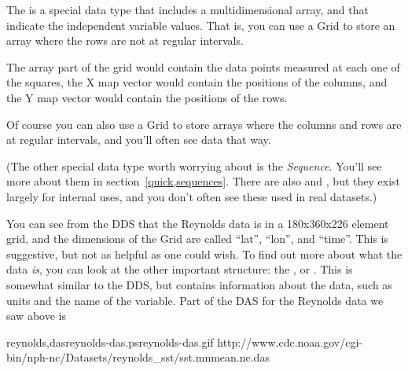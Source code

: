 \documentclass{dods-book}
\begin{document}
The  is a special \opendap data type that includes a
multidimensional array, and  that indicate the
independent variable values.  That is, you can use a Grid to store an
array where the rows are not at regular intervals.  


The array part of the grid would contain the data points measured at
each one of the squares, the X map vector would contain the positions
of the columns, and the Y map vector would contain the positions of
the rows.

Of course you can also use a Grid to store arrays where the columns
and rows are at regular intervals, and you'll often see \opendap data that
way. 

(The other special \opendap data type worth worrying about is the
\emph{Sequence}.  You'll see more about them in
section~\ref{quick,sequences}.  There are also  and
, but they exist largely for internal uses, and you don't
often see these used in real datasets.)

You can see from the DDS that the Reynolds data is in a 180x360x226
element grid, and the dimensions of the Grid are called ``lat'',
``lon'', and ``time''.  This is suggestive, but not as helpful as one
could wish.  To find out more about what the data \emph{is}, you can
look at the other important \opendap structure: the , or
.  This is somewhat similar to the DDS,
but contains information about the data, such as units and the name of
the variable.  Part of the DAS for the Reynolds data we saw above is

{reynolds,das}{reynolds-das.ps}{reynolds-das.gif}
{http://www.cdc.noaa.gov/cgi-bin/nph-nc/Datasets/reynolds_sst/sst.mnmean.nc.das}

\end{document}
